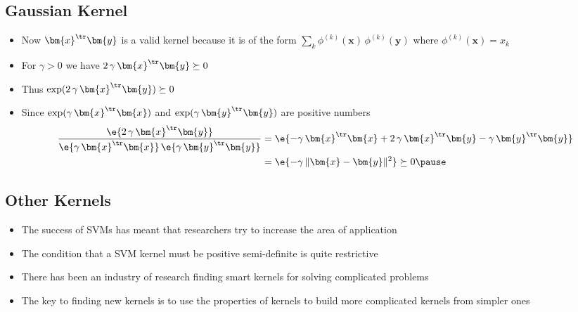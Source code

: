 
\begin{slide}
\section{Gaussian Kernel}

\begin{PauseHighLight}
  \begin{itemize}
  \item Now $\bm{x}^\tr\bm{y}$ is a valid kernel because it is of the
    form $\sum_k \phi^{(k)}(\bm{x})\,\phi^{(k)}(\bm{y})$ where $\phi^{(k)}(\bm{x}) =
    x_k$\pause
  \item For $\gamma>0$ we have $2\,\gamma\,\bm{x}^\tr\bm{y}\succeq 0$
  \item Thus $\exp(2\,\gamma\,\bm{x}^\tr\bm{y}) \succeq 0$\pause
  \item Since $\exp(\gamma\,\bm{x}^\tr\bm{x})$ and
    $\exp(\gamma\,\bm{y}^\tr\bm{y})$ are positive numbers
    \begin{align*}
      \frac{\e{2\,\gamma\,\bm{x}^\tr\bm{y}}}{\e{\gamma\,\bm{x}^\tr\bm{x}}\,
        \e{\gamma\,\bm{y}^\tr\bm{y}}} &= \e{-\gamma\,\bm{x}^\tr\bm{x} +
        2\,\gamma\,\bm{x}^\tr\bm{y} - \gamma\,\bm{y}^\tr\bm{y}} \\
      &= \e{-\gamma\,\|\bm{x}-\bm{y}\|^2} \succeq 0\pause
    \end{align*}
  \end{itemize}
\end{PauseHighLight}

\end{slide}



\begin{slide}
\section{Other Kernels}

\begin{PauseHighLight}
  \begin{itemize}
  \item The success of SVMs has meant that researchers try to increase
    the area of application\pause
  \item The condition that a SVM kernel must be positive semi-definite
    is quite restrictive\pause
  \item There has been an industry of research finding smart kernels for
    solving complicated problems\pause
  \item The key to finding new kernels is to use the properties of
    kernels to build more complicated kernels from simpler ones\pause
  \end{itemize}
\end{PauseHighLight}

\end{slide}

